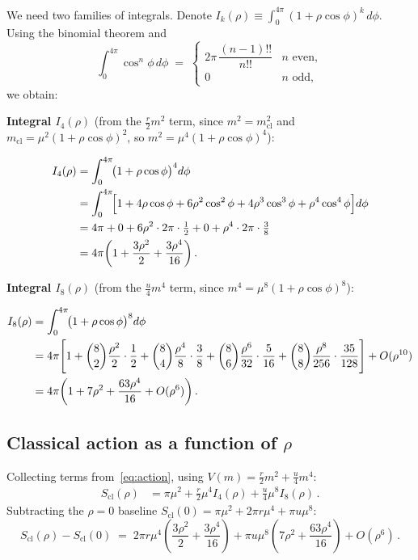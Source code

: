 \documentclass[12pt,a4paper]{article}
\theoremstyle{definition}
\newcommand{\Scl}{S_{\mathrm{cl}}}
\newcommand{\mcl}{m_{\mathrm{cl}}}
\begin{document}
We need two families of integrals.
Denote $I_k(\rho) \equiv \int_0^{4\pi}(1+\rho\cos\phi)^k\,d\phi$.
Using the binomial theorem and
\begin{equation}
  \int_0^{4\pi}\cos^n\phi\,d\phi \;=\;
  \begin{cases}
    2\pi\,\dfrac{(n-1)!!}{n!!} & n \text{ even},\\[6pt]
    0 & n \text{ odd},
  \end{cases}
\end{equation}
we obtain:

\medskip
\noindent\textbf{Integral $I_4(\rho)$} (from the $\tfrac{r}{2}m^2$ term,
since $m^2 = \mcl^2$ and $\mcl = \mu^2(1+\rho\cos\phi)^2$, so $m^2 = \mu^4(1+\rho\cos\phi)^4$):

\begin{align}
  I_4(\rho)
  &= \int_0^{4\pi}\!\bigl(1+\rho\cos\phi\bigr)^4 d\phi \notag\\
  &= \int_0^{4\pi}\!\Bigl[
       1
       + 4\rho\cos\phi
       + 6\rho^2\cos^2\phi
       + 4\rho^3\cos^3\phi
       + \rho^4\cos^4\phi
     \Bigr] d\phi \notag\\
  &= 4\pi
     + 0
     + 6\rho^2 \cdot 2\pi \cdot \tfrac{1}{2}
     + 0
     + \rho^4 \cdot 2\pi \cdot \tfrac{3}{8} \notag\\
  \label{eq:I4}
  &= 4\pi\!\left(1 + \frac{3\rho^2}{2} + \frac{3\rho^4}{16}\right).
\end{align}

\medskip
\noindent\textbf{Integral $I_8(\rho)$} (from the $\tfrac{u}{4}m^4$ term,
since $m^4 = \mu^8(1+\rho\cos\phi)^8$):

\begin{align}
  I_8(\rho)
  &= \int_0^{4\pi}\!\bigl(1+\rho\cos\phi\bigr)^8 d\phi \notag\\
  &= 4\pi\Bigg[
       1
       + \binom{8}{2}\frac{\rho^2}{2}\cdot\frac{1}{2}
       + \binom{8}{4}\frac{\rho^4}{8}\cdot\frac{3}{8}
       + \binom{8}{6}\frac{\rho^6}{32}\cdot\frac{5}{16}
       + \binom{8}{8}\frac{\rho^8}{256}\cdot\frac{35}{128}
     \Bigg] + O(\rho^{10}) \notag\\
  \label{eq:I8}
  &= 4\pi\!\left(1 + 7\rho^2 + \frac{63\rho^4}{16} + O(\rho^6)\right).
\end{align}

\subsection{Classical action as a function of $\rho$}

Collecting terms from~\eqref{eq:action}, using $V(m) = \tfrac{r}{2}m^2 + \tfrac{u}{4}m^4$:
\begin{align}
  \Scl(\rho)
  &= \pi\mu^2
     + \frac{r}{2}\mu^4 I_4(\rho)
     + \frac{u}{4}\mu^8 I_8(\rho)\,.
\end{align}
Subtracting the $\rho = 0$ baseline $\Scl(0) = \pi\mu^2 + 2\pi r\mu^4 + \pi u\mu^8$:
\begin{equation}
  \label{eq:Scl_rho}
  \Scl(\rho) - \Scl(0)
  \;=\; 2\pi r\mu^4\!\left(\frac{3\rho^2}{2} + \frac{3\rho^4}{16}\right)
        + \pi u\mu^8\!\left(7\rho^2 + \frac{63\rho^4}{16}\right)
        + O(\rho^6)\,.
\end{equation}
\end{document}
